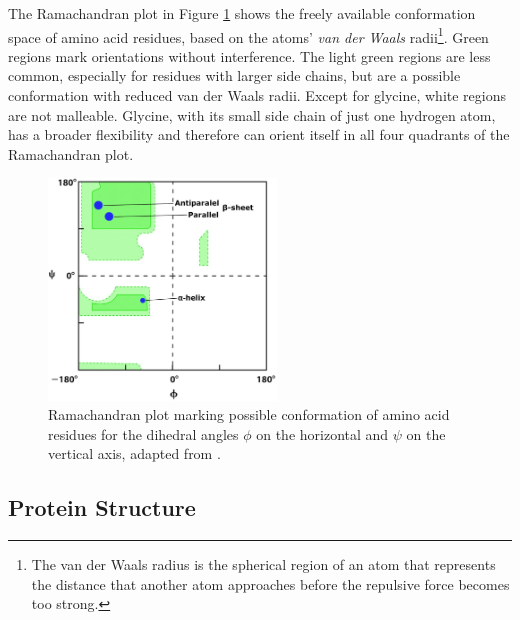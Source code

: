The Ramachandran plot in Figure \ref{fig:ramachandran} shows the freely available conformation space of amino acid residues, based on the atoms' \textit{van der Waals} radii\footnote{The van der Waals radius is the spherical region of an atom that represents the distance that another atom approaches before the repulsive force becomes too strong.}. 
Green regions mark orientations without interference. The light green regions are less common, especially for residues with larger side chains, but are a possible conformation with reduced van der Waals radii. Except for glycine, white regions are not malleable. Glycine, with its small side chain of just one hydrogen atom, has a broader flexibility and therefore can orient itself in all four quadrants of the Ramachandran plot.

\begin{figure}[h]
	\begin{center}
		\includegraphics[width=0.54\textwidth]{fig/Ramaplot}
	\end{center}
	
	\caption[Ramachandran plot marking possible conformation of amino acid residues for the dihedral angles.]{Ramachandran plot marking possible conformation of amino acid residues for the dihedral angles $\phi$ on the horizontal and $\psi$ on the vertical axis, adapted from \cite{Nelson.2013}.}
	\label{fig:ramachandran}
\end{figure} 
 
 
\subsection{Protein Structure}


